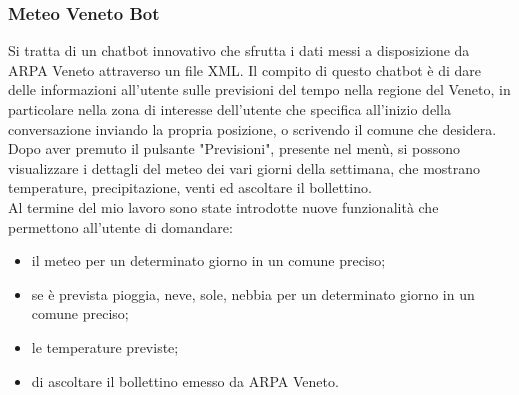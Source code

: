 \subsubsection{Meteo Veneto Bot}
Si tratta di un \gls{chatbot} innovativo che sfrutta i dati messi a disposizione da ARPA Veneto attraverso un file \gls{XML}. Il compito di questo  \gls{chatbot} è di dare delle informazioni all'utente sulle previsioni del tempo nella regione del Veneto, in particolare nella zona di interesse dell'utente che specifica all'inizio della conversazione inviando la propria posizione, o scrivendo il comune che desidera. Dopo aver premuto il pulsante "Previsioni", presente nel menù, si possono visualizzare i dettagli del meteo dei vari giorni della settimana, che mostrano temperature, precipitazione, venti ed ascoltare il bollettino.\\
Al termine del mio lavoro sono state introdotte nuove funzionalità che permettono all'utente di domandare:
\begin{itemize}
	\item il meteo per un determinato giorno in un comune preciso;
	\item se è prevista pioggia, neve, sole, nebbia per un determinato giorno in un comune preciso;
	\item le temperature previste;
	\item di ascoltare il bollettino emesso da ARPA Veneto.
\end{itemize}

